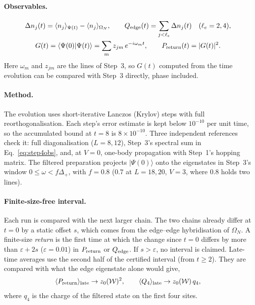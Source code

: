 \documentclass[11pt,a4paper]{article}
\begin{document}
\paragraph{Observables.}
\begin{equation}
\begin{gathered}
\Delta n_j(t)=\langle n_j\rangle_{\Psi(t)}-\langle n_j\rangle_{\Omega_N},\qquad
Q_{\rm edge}(t)=\sum_{j<\ell_e}\Delta n_j(t)\quad(\ell_e=2,4),\\
G(t)=\langle\Psi(0)|\Psi(t)\rangle=\sum_m z_{jm}\,e^{-i\omega_m t},\qquad
P_{\rm return}(t)=|G(t)|^2 .
\end{gathered}
\label{eq:step4obs}
\end{equation}
Here $\omega_m$ and $z_{jm}$ are the lines of Step~3, so $G(t)$ computed from the time evolution can be compared with Step~3 directly, phase included.

\paragraph{Method.} The evolution uses short-iterative Lanczos (Krylov) steps with full reorthogonalisation. Each step's error estimate is kept below $10^{-10}$ per unit time, so the accumulated bound at $t=8$ is $8\times10^{-10}$. Three independent references check it: full diagonalisation ($L=8,12$), Step~3's spectral sum in Eq.~\eqref{eq:step4obs}, and, at $V=0$, one-body propagation with Step~1's hopping matrix. The filtered preparation projects $|\Psi(0)\rangle$ onto the eigenstates in Step~3's window $0\le\omega<f\Delta_+$, with $f=0.8$ ($0.7$ at $L=18,20$, $V=3$, where $0.8$ holds two lines).

\paragraph{Finite-size-free interval.} Each run is compared with the next larger chain. The two chains already differ at $t=0$ by a static offset $s$, which comes from the edge--edge hybridisation of $\Omega_N$. A finite-size \emph{return} is the first time at which the change since $t=0$ differs by more than $\varepsilon+2s$ ($\varepsilon=0.01$) in $P_{\rm return}$ or $Q_{\rm edge}$. If $s>\varepsilon$, no interval is claimed. Late-time averages use the second half of the certified interval (from $t\ge2$). They are compared with what the edge eigenstate alone would give,
\begin{equation}
\langle P_{\rm return}\rangle_{\rm late}\to z_0(\mathcal{W})^2,\qquad \langle Q_4\rangle_{\rm late}\to z_0(\mathcal{W})\,q_4 ,
\label{eq:step4late}
\end{equation}
where $q_4$ is the charge of the filtered state on the first four sites.
\end{document}
